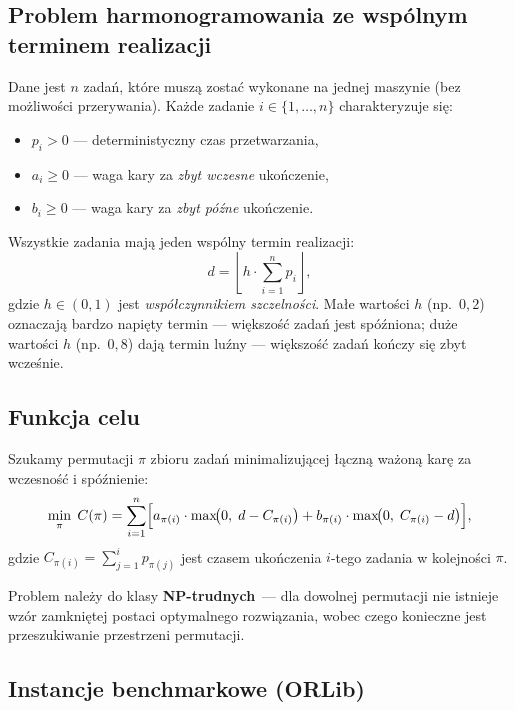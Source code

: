 \documentclass[11pt,a4paper]{article}
\begin{document}
\subsection{Problem harmonogramowania ze wspólnym terminem realizacji}

Dane jest $n$ zadań, które muszą zostać wykonane na jednej maszynie
(bez możliwości przerywania).
Każde zadanie $i \in \{1, \ldots, n\}$ charakteryzuje się:

\begin{itemize}[noitemsep]
  \item $p_i > 0$ — deterministyczny czas przetwarzania,
  \item $a_i \geq 0$ — waga kary za \emph{zbyt wczesne} ukończenie,
  \item $b_i \geq 0$ — waga kary za \emph{zbyt późne} ukończenie.
\end{itemize}

Wszystkie zadania mają jeden wspólny termin realizacji:
\begin{equation}
  d = \left\lfloor h \cdot \sum_{i=1}^{n} p_i \right\rfloor,
  \label{eq:due_date}
\end{equation}
gdzie $h \in (0,1)$ jest \emph{współczynnikiem szczelności}.
Małe wartości $h$ (np.\ $0{,}2$) oznaczają bardzo napięty termin —
większość zadań jest spóźniona; duże wartości $h$ (np.\ $0{,}8$) dają
termin luźny — większość zadań kończy się zbyt wcześnie.

\subsection{Funkcja celu}

Szukamy permutacji $\pi$ zbioru zadań minimalizującej łączną ważoną karę
za wczesność i spóźnienie:
\begin{equation}
  \min_{\pi} \; C(\pi) = \sum_{i=1}^{n}
    \Bigl[ a_{\pi(i)} \cdot \max\!\bigl(0,\; d - C_{\pi(i)}\bigr)
         + b_{\pi(i)} \cdot \max\!\bigl(0,\; C_{\pi(i)} - d\bigr) \Bigr],
  \label{eq:objective}
\end{equation}
gdzie $C_{\pi(i)} = \sum_{j=1}^{i} p_{\pi(j)}$ jest czasem ukończenia
$i$-tego zadania w kolejności $\pi$.

Problem należy do klasy \textbf{NP-trudnych}~— dla dowolnej permutacji nie
istnieje wzór zamkniętej postaci optymalnego rozwiązania, wobec czego
konieczne jest przeszukiwanie przestrzeni permutacji.

\subsection{Instancje benchmarkowe (ORLib)}
\end{document}
